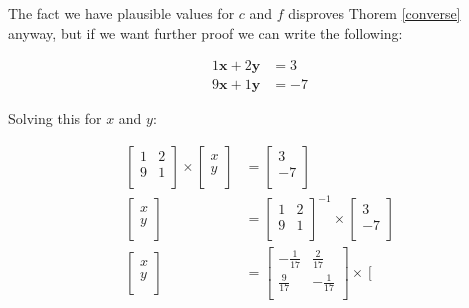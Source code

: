 \documentclass[12pt]{article}
\newcommand{\theoremref}[1]{Thorem \ref{#1}}
\begin{document}
	The fact we have plausible values for \(c\) and \(f\) disproves \theoremref{converse} anyway, but if we want further proof we can write the following:
	
			
	\begin{align}
		1\bm{x} + 2\bm{y} &= 3 \\
		9\bm{x} + 1\bm{y} &= -7
	\end{align}
	
	Solving this for \(x\) and \(y\):
	
	
	\begin{align}
		\left [ \begin{array}{cc} 
			1 & 2 \\
			9 & 1 \\
		\end{array} \right ] \times
		\left [ \begin{array}{c}
			x \\
			y \\
		\end{array}\right ] &= 
		\left [ \begin{array}{c}
			3 \\
			-7 \\
		\end{array}\right ] \\
		\left [ \begin{array}{c}
			x \\
			y \\
		\end{array}\right ] &= 
		\left [ \begin{array}{cc} 
			1 & 2 \\
			9 & 1 \\
		\end{array} \right ]^{-1} \times
		\left [ \begin{array}{c}
			3 \\
			-7 \\
		\end{array}\right ] \\
				\left [ \begin{array}{c}
			x \\
			y \\
		\end{array}\right ] &= 
		\left [ \begin{array}{cc} 
			-\frac{1}{17} & \frac{2}{17} \\
			\frac{9}{17} & -\frac{1}{17} \\
		\end{array} \right ] \times
		\left [ \begin{array}{c}

\end{array}
\end{align}
\end{document}
